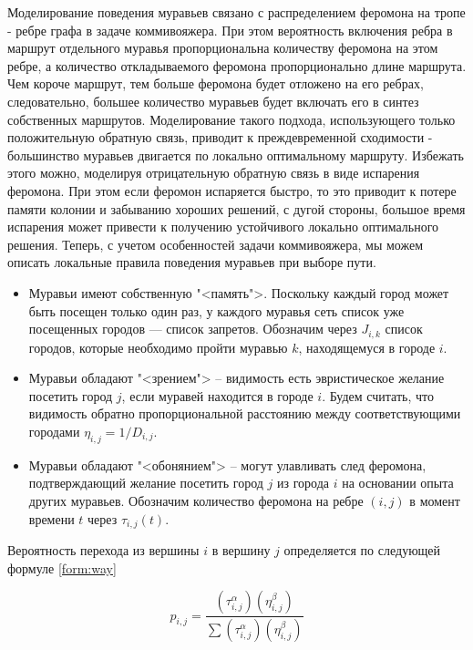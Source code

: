 Моделирование поведения муравьев связано с распределением феромона на
тропе - ребре графа в задаче коммивояжера. При этом вероятность включения
ребра в маршрут отдельного муравья пропорциональна количеству феромона на
этом ребре, а количество откладываемого феромона пропорционально длине
маршрута. Чем короче маршрут, тем больше феромона будет отложено на его
ребрах, следовательно, большее количество муравьев будет включать его в синтез
собственных маршрутов. Моделирование такого подхода, использующего только
положительную обратную связь, приводит к преждевременной сходимости -
большинство муравьев двигается по локально оптимальному маршруту. Избежать
этого можно, моделируя отрицательную обратную связь в виде испарения феромона.
При этом если феромон испаряется быстро, то это приводит к потере памяти колонии и забыванию хороших решений,
с дугой стороны, большое время испарения может привести к получению устойчивого локально оптимального решения.
Теперь, с учетом особенностей задачи коммивояжера, мы можем описать локальные правила поведения муравьев при выборе пути.


\begin{itemize}
	\item Муравьи имеют собственную "<память">. Поскольку каждый город может быть посещен только один раз,
    у каждого муравья сеть список уже посещенных городов — список запретов.
    Обозначим через $J_{i,k}$ список городов, которые необходимо пройти муравью $k$, находящемуся в городе $i$.
	\item Муравьи обладают "<зрением"> -- видимость есть эвристическое желание посетить город $j$, если муравей находится в городе $i$. Будем считать, что видимость обратно пропорциональной расстоянию между соответствующими городами $\eta_{i,j} = 1/D_{i,j}$.
	\item Муравьи обладают "<обонянием"> -- могут улавливать след феромона, подтверждающий желание посетить город $j$ из города $i$ на основании опыта других муравьев. Обозначим количество феромона на ребре $(i,j)$ в момент времени $t$ через $\tau_{i,j}(t)$. 
\end{itemize}

Вероятность перехода из вершины $i$ в вершину $j$ определяется по следующей формуле \ref{form:way}

\begin{equation}\label{form:way} 
	p_{i,j}={\frac {(\tau_{i,j}^{\alpha })(\eta_{i,j}^{\beta })}{\sum (\tau_{i,j}^{\alpha})(\eta_{i,j}^{\beta })}}
\end{equation}

